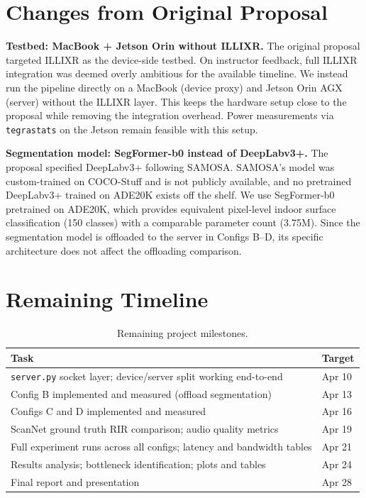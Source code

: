 \documentclass[11pt]{article}
\begin{document}
\section{Changes from Original Proposal}

\textbf{Testbed: MacBook + Jetson Orin without ILLIXR.}
The original proposal targeted ILLIXR as the device-side testbed. On instructor
feedback, full ILLIXR integration was deemed overly ambitious for the available
timeline. We instead run the pipeline directly on a MacBook (device proxy) and
Jetson Orin AGX (server) without the ILLIXR layer. This keeps the hardware
setup close to the proposal while removing the integration overhead. Power
measurements via \texttt{tegrastats} on the Jetson remain feasible with this setup.

\textbf{Segmentation model: SegFormer-b0 instead of DeepLabv3+.}
The proposal specified DeepLabv3+ following SAMOSA. SAMOSA's model was
custom-trained on COCO-Stuff and is not publicly available, and no pretrained
DeepLabv3+ trained on ADE20K exists off the shelf. We use SegFormer-b0
pretrained on ADE20K, which provides equivalent pixel-level indoor surface
classification (150 classes) with a comparable parameter count (3.75M).
Since the segmentation model is offloaded to the server in Configs B--D,
its specific architecture does not affect the offloading comparison.

\section{Remaining Timeline}

\begin{table}[H]
\small\centering
\caption{Remaining project milestones.}
\label{tab:timeline}
\begin{tabular}{@{}ll@{}}
\toprule
\textbf{Task} & \textbf{Target}\\
\midrule
\texttt{server.py} socket layer; device/server split working end-to-end & Apr 10\\
Config B implemented and measured (offload segmentation)                & Apr 13\\
Configs C and D implemented and measured                                & Apr 16\\
ScanNet ground truth RIR comparison; audio quality metrics              & Apr 19\\
Full experiment runs across all configs; latency and bandwidth tables   & Apr 21\\
Results analysis; bottleneck identification; plots and tables           & Apr 24\\
Final report and presentation                                           & Apr 28\\
\bottomrule
\end{tabular}
\end{table}
\end{document}
